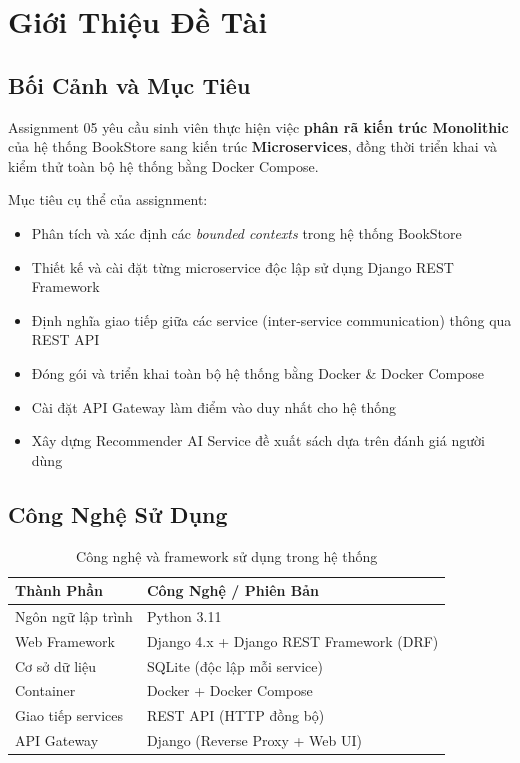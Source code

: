 \documentclass[12pt,a4paper]{article}
\begin{document}
\tableofcontents
\newpage

\section{Giới Thiệu Đề Tài}

\subsection{Bối Cảnh và Mục Tiêu}

Assignment 05 yêu cầu sinh viên thực hiện việc \textbf{phân rã kiến trúc Monolithic} của hệ thống BookStore sang kiến trúc \textbf{Microservices}, đồng thời triển khai và kiểm thử toàn bộ hệ thống bằng Docker Compose.

Mục tiêu cụ thể của assignment:
\begin{itemize}[leftmargin=1.5cm]
  \item Phân tích và xác định các \textit{bounded contexts} trong hệ thống BookStore
  \item Thiết kế và cài đặt từng microservice độc lập sử dụng Django REST Framework
  \item Định nghĩa giao tiếp giữa các service (inter-service communication) thông qua REST API
  \item Đóng gói và triển khai toàn bộ hệ thống bằng Docker \& Docker Compose
  \item Cài đặt API Gateway làm điểm vào duy nhất cho hệ thống
  \item Xây dựng Recommender AI Service đề xuất sách dựa trên đánh giá người dùng
\end{itemize}

\subsection{Công Nghệ Sử Dụng}

\begin{table}[H]
  \centering
  \caption{Công nghệ và framework sử dụng trong hệ thống}
  \begin{tabularx}{\textwidth}{lX}
    \toprule
    \textbf{Thành Phần} & \textbf{Công Nghệ / Phiên Bản} \\
    \midrule
    Ngôn ngữ lập trình   & Python 3.11 \\
    Web Framework        & Django 4.x + Django REST Framework (DRF) \\
    Cơ sở dữ liệu        & SQLite (độc lập mỗi service) \\
    Container            & Docker + Docker Compose \\
    Giao tiếp services   & REST API (HTTP đồng bộ) \\
    API Gateway          & Django (Reverse Proxy + Web UI) \\
    \bottomrule
  \end{tabularx}
\end{table}
\end{document}
